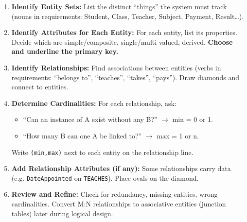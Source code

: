 \documentclass[11pt]{article}
\begin{document}
\begin{methode}
\begin{enumerate}
    \item \textbf{Identify Entity Sets:} List the distinct ``things'' the system must track (nouns in requirements: Student, Class, Teacher, Subject, Payment, Result\ldots).
    \item \textbf{Identify Attributes for Each Entity:} For each entity, list its properties. Decide which are simple/composite, single/multi-valued, derived. \textbf{Choose and underline the primary key.}
    \item \textbf{Identify Relationships:} Find associations between entities (verbs in requirements: ``belongs to'', ``teaches'', ``takes'', ``pays''). Draw diamonds and connect to entities.
    \item \textbf{Determine Cardinalities:} For each relationship, ask:
    \begin{itemize}
        \item ``Can an instance of A exist without any B?'' $\to$ min = 0 or 1.
        \item ``How many B can one A be linked to?'' $\to$ max = 1 or n.
    \end{itemize}
    Write \texttt{(min,max)} next to each entity on the relationship line.
    \item \textbf{Add Relationship Attributes (if any):} Some relationships carry data (e.g. \texttt{DateAppointed} on \texttt{TEACHES}). Place ovals on the diamond.
    \item \textbf{Review and Refine:} Check for redundancy, missing entities, wrong cardinalities. Convert M:N relationships to associative entities (junction tables) later during logical design.
\end{enumerate}
\end{methode}
\end{document}
